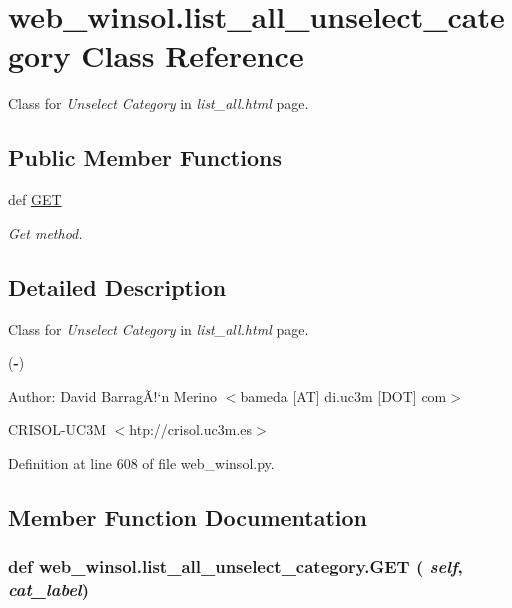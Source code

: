 \hypertarget{classweb__winsol_1_1list__all__unselect__category}{
\section{web\_\-winsol.list\_\-all\_\-unselect\_\-category Class Reference}
\label{classweb__winsol_1_1list__all__unselect__category}
}
Class for {\em Unselect\/} {\em Category\/} in {\em list\_\-all.html\/} page.  


\subsection*{Public Member Functions}
\begin{CompactItemize}
\item 
def \hyperlink{classweb__winsol_1_1list__all__unselect__category_42da217e087375014123dc65e14b5e83}{GET}
\begin{CompactList}\small\item\em Get method. \item\end{CompactList}\end{CompactItemize}


\subsection{Detailed Description}
Class for {\em Unselect\/} {\em Category\/} in {\em list\_\-all.html\/} page. 

({\bf -})

\begin{Desc}
\item[Author:]David Barrag\~{A}!`n Merino $<$bameda \mbox{[}AT\mbox{]} di.uc3m \mbox{[}DOT\mbox{]} com$>$ 

CRISOL-UC3M $<$htp://crisol.uc3m.es$>$ \end{Desc}




Definition at line 608 of file web\_\-winsol.py.

\subsection{Member Function Documentation}
\hypertarget{classweb__winsol_1_1list__all__unselect__category_42da217e087375014123dc65e14b5e83}{
\subsubsection[GET]{\setlength{\rightskip}{0pt plus 5cm}def web\_\-winsol.list\_\-all\_\-unselect\_\-category.GET ( {\em self},  {\em cat\_\-label})}}
\label{classweb__winsol_1_1list__all__unselect__category_42da217e087375014123dc65e14b5e83}



